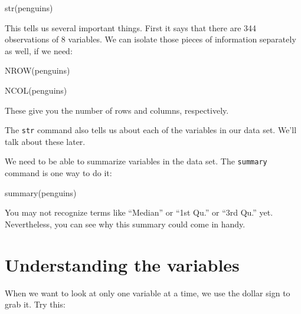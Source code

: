 \documentclass[
]{book}
\newenvironment{Shaded}{\begin{snugshade}}{\end{snugshade}}
\newcommand{\FunctionTok}[1]{\textcolor[rgb]{0.00,0.00,0.00}{#1}}
\newcommand{\NormalTok}[1]{#1}
\newcommand{\SpecialCharTok}[1]{\textcolor[rgb]{0.00,0.00,0.00}{#1}}
\begin{document}
\begin{Shaded}
\begin{Highlighting}[]
\FunctionTok{str}\NormalTok{(penguins)}
\end{Highlighting}
\end{Shaded}

This tells us several important things. First it says that there are 344 observations of 8 variables. We can isolate those pieces of information separately as well, if we need:

\begin{Shaded}
\begin{Highlighting}[]
\FunctionTok{NROW}\NormalTok{(penguins)}
\end{Highlighting}
\end{Shaded}

\begin{Shaded}
\begin{Highlighting}[]
\FunctionTok{NCOL}\NormalTok{(penguins)}
\end{Highlighting}
\end{Shaded}

These give you the number of rows and columns, respectively.

The \texttt{str} command also tells us about each of the variables in our data set. We'll talk about these later.

We need to be able to summarize variables in the data set. The \texttt{summary} command is one way to do it:

\begin{Shaded}
\begin{Highlighting}[]
\FunctionTok{summary}\NormalTok{(penguins)}
\end{Highlighting}
\end{Shaded}

You may not recognize terms like ``Median'' or ``1st Qu.'' or ``3rd Qu.'' yet. Nevertheless, you can see why this summary could come in handy.

\hypertarget{intror-understandingvariables}{%
\section{Understanding the variables}\label{intror-understandingvariables}}

When we want to look at only one variable at a time, we use the dollar sign to grab it. Try this:

\begin{Shaded}
\end{Shaded}
\end{document}
